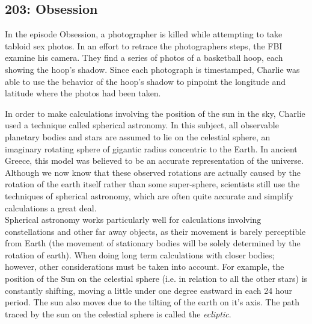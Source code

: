 \newpage
\subsection{203: Obsession\label{203}}

In the episode Obsession, a photographer is killed while attempting to take tabloid sex photos. In an effort to retrace the photographers steps, the FBI examine his camera. They find a series of photos of a basketball hoop, each showing the hoop's shadow. Since each photograph is timestamped, Charlie was able to use the behavior of the hoop's shadow to pinpoint the longitude and latitude where the photos had been taken. \\


In order to make calculations involving the position of the sun in the sky, Charlie used a technique called spherical astronomy. In this subject, all observable planetary bodies and stars are assumed to lie on the celestial sphere, an imaginary rotating sphere of gigantic radius concentric to the Earth. In ancient Greece, this model was believed to be an accurate representation of the universe. Although we now know that these observed rotations are actually caused by the rotation of the earth itself rather than some super-sphere, scientists still use the techniques of spherical astronomy, which are often quite accurate and simplify calculations a great deal. \\

Spherical astronomy works particularly well for calculations involving constellations and other far away objects, as their movement is barely perceptible from Earth (the movement of stationary bodies will be solely determined by the rotation of earth). When doing long term calculations with closer bodies; however, other considerations must be taken into account. For example, the position of the Sun on the celestial sphere (i.e. in relation to all the other stars) is constantly shifting, moving a little under one degree eastward in each 24 hour period. The sun also moves due to the tilting of the earth on it's axis. The path traced by the sun on the celestial sphere is called the \emph{ecliptic}. \\

 \vspace{0.2cm}

